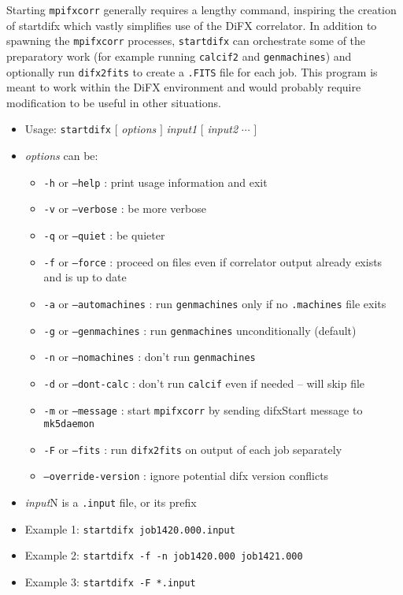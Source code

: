 Starting {\tt mpifxcorr} generally requires a lengthy command, inspiring the creation of {startdifx} which vastly simplifies use of the DiFX correlator.
In addition to spawning the {\tt mpifxcorr} processes, {\tt startdifx} can orchestrate some of the preparatory work (for example running {\tt calcif2} and {\tt genmachines}) and optionally run {\tt difx2fits} to create a {\tt .FITS} file for each job.
This program is meant to work within the DiFX environment and would probably require modification to be useful in other situations.

\begin{itemize}
\item[] Usage: {\tt startdifx} $[$ {\em options} $]$ {\em input1} $[$ {\em input2} $\cdots$ $]$
\item[] {\em options} can be:
\begin{itemize}
\item[] {\tt -h} or {\tt --help} : print usage information and exit
\item[] {\tt -v} or {\tt --verbose} : be more verbose
\item[] {\tt -q} or {\tt --quiet} : be quieter
\item[] {\tt -f} or {\tt --force} : proceed on files even if correlator output already exists and is up to date
\item[] {\tt -a} or {\tt --automachines} : run {\tt genmachines} only if no {\tt .machines} file exits
\item[] {\tt -g} or {\tt --genmachines} : run {\tt genmachines} unconditionally (default)
\item[] {\tt -n} or {\tt --nomachines} : don't run {\tt genmachines}
\item[] {\tt -d} or {\tt --dont-calc} : don't run {\tt calcif} even if needed -- will skip file
\item[] {\tt -m} or {\tt --message} : start {\tt mpifxcorr} by sending {difxStart} message to {\tt mk5daemon}
\item[] {\tt -F} or {\tt --fits} : run {\tt difx2fits} on output of each job separately
\item[] {\tt --override-version} : ignore potential difx version conflicts
\end{itemize} 
\item[] {\em input}N is a {\tt .input} file, or its prefix
\item[] Example 1: {\tt startdifx job1420.000.input}
\item[] Example 2: {\tt startdifx -f -n job1420.000 job1421.000}
\item[] Example 3: {\tt startdifx -F *.input}
\end{itemize}

